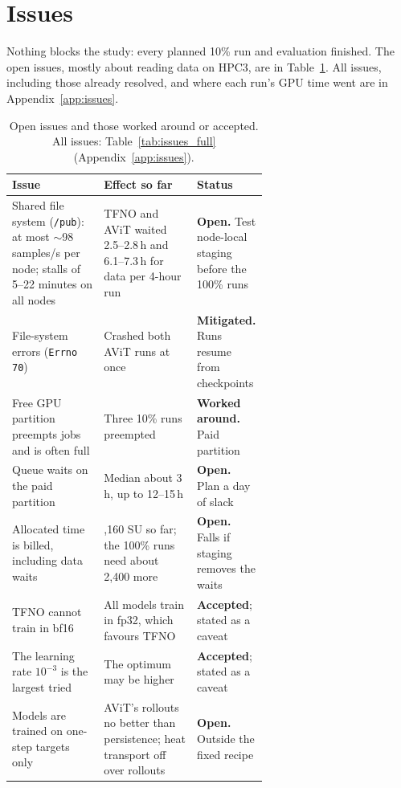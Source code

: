 \documentclass[11pt]{article}
\begin{document}
\section{Issues}
\label{sec:issues}

Nothing blocks the study: every planned 10\% run and evaluation finished. The open issues, mostly about reading
data on HPC3, are in Table~\ref{tab:issues}. All issues, including those already resolved, and where each run's GPU
time went are in Appendix~\ref{app:issues}.

\begin{table}[!htbp]
\centering\footnotesize
\begin{tabularx}{\linewidth}{@{}>{\raggedright\arraybackslash}p{0.36\linewidth}>{\raggedright\arraybackslash}X>{\raggedright\arraybackslash}p{0.27\linewidth}@{}}
\toprule
Issue & Effect so far & Status \\
\midrule
Shared file system (\texttt{/pub}): at most $\sim$98 samples/s per node; stalls of 5--22 minutes on all nodes &
TFNO and AViT waited 2.5--2.8\,h and 6.1--7.3\,h for data per 4-hour run & \textbf{Open.} Test node-local staging
before the 100\% runs \\
File-system errors (\texttt{Errno 70}) & Crashed both AViT runs at once & \textbf{Mitigated.} Runs resume from
checkpoints \\
Free GPU partition preempts jobs and is often full & Three 10\% runs preempted & \textbf{Worked around.} Paid
partition \\
Queue waits on the paid partition & Median about 3\,h, up to 12--15\,h & \textbf{Open.} Plan a day of slack \\
Allocated time is billed, including data waits & 2,160 SU so far; the 100\% runs need about 2,400 more &
\textbf{Open.} Falls if staging removes the waits \\
TFNO cannot train in bf16 & All models train in fp32, which favours TFNO & \textbf{Accepted}; stated as a caveat \\
The learning rate $10^{-3}$ is the largest tried & The optimum may be higher & \textbf{Accepted}; stated as a
caveat \\
Models are trained on one-step targets only & AViT's rollouts no better than persistence; heat transport off over
rollouts & \textbf{Open.} Outside the fixed recipe \\
\bottomrule
\end{tabularx}
\caption{Open issues and those worked around or accepted. All issues: Table~\ref{tab:issues_full}
(Appendix~\ref{app:issues}).}
\label{tab:issues}
\end{table}
\end{document}
